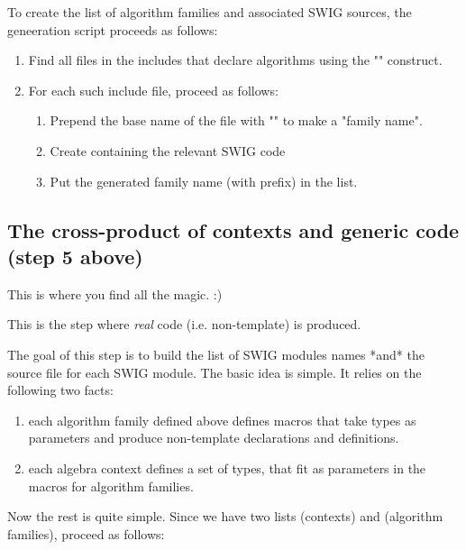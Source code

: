 To create the list of algorithm families and associated SWIG sources,
the geneeration script proceeds as follows:

\begin{enumerate}
\item Find all files in the \Vauc includes that declare algorithms
  using the "" construct.

\item For each such include file, proceed as follows:

  \begin{enumerate}
  \item Prepend the base name of the file with "" to make a
    "family name".

  \item Create  containing the
    relevant SWIG code

  \item Put the generated family name (with prefix) in the 
    list.
  \end{enumerate}
\end{enumerate}

\subsection{The cross-product of contexts and generic code (step 5 above)}

This is where you find all the magic. :)

This is the step where \emph{real} code (i.e. non-template) is produced.

The goal of this step is to build the list of SWIG modules names *and*
the source file for each SWIG module. The basic idea is simple. It
relies on the following two facts:

\begin{enumerate}
\item each algorithm family defined above defines macros that take
  types as parameters and produce non-template declarations and
  definitions.

\item each algebra context defines a set of types, that fit as
  parameters in the macros for algorithm families.
\end{enumerate}

Now the rest is quite simple. Since we have two lists 
(contexts) and  (algorithm families), proceed as follows:

